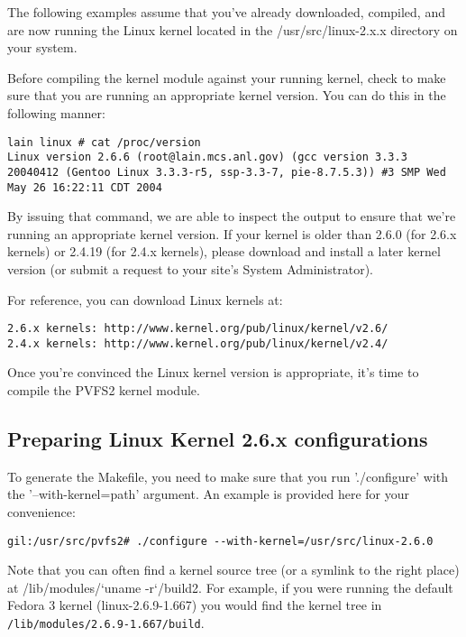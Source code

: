 \documentclass[11pt, letterpaper]{article}
\begin{document}
The following examples assume that you've already downloaded,
compiled, and are now running the Linux kernel located in the
/usr/src/linux-2.x.x directory on your system.

Before compiling the kernel module against your running kernel, check
to make sure that you are running an appropriate kernel version.  You
can do this in the following manner:

\begin{verbatim}
lain linux # cat /proc/version 
Linux version 2.6.6 (root@lain.mcs.anl.gov) (gcc version 3.3.3
20040412 (Gentoo Linux 3.3.3-r5, ssp-3.3-7, pie-8.7.5.3)) #3 SMP Wed
May 26 16:22:11 CDT 2004
\end{verbatim}

By issuing that command, we are able to inspect the output to ensure
that we're running an appropriate kernel version.  If your kernel is
older than 2.6.0 (for 2.6.x kernels) or 2.4.19 (for 2.4.x kernels),
please download and install a later kernel version (or submit a
request to your site's System Administrator).

For reference, you can download Linux kernels at:
\begin{verbatim}
2.6.x kernels: http://www.kernel.org/pub/linux/kernel/v2.6/
2.4.x kernels: http://www.kernel.org/pub/linux/kernel/v2.4/
\end{verbatim}

Once you're convinced the Linux kernel version is appropriate, it's
time to compile the PVFS2 kernel module.

\subsection{Preparing Linux Kernel 2.6.x configurations}
\label{sec:vfs-configure}

To generate the Makefile, you need to make sure that you run
'./configure' with the '--with-kernel=path' argument.  An example is
provided here for your convenience:

\begin{verbatim}
gil:/usr/src/pvfs2# ./configure --with-kernel=/usr/src/linux-2.6.0
\end{verbatim}

Note that you can often find a kernel source tree (or a symlink to the
right place) at /lib/modules/`uname -r`/build2.  For example, if you were
running the default Fedora 3 kernel (linux-2.6.9-1.667) you would find the
kernel tree in \texttt{/lib/modules/2.6.9-1.667/build}.
\end{document}
